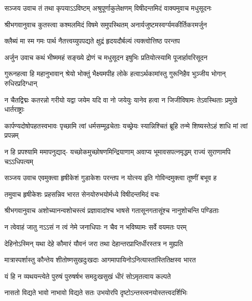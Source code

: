 {सञ्जय उवाच}
\twolineshloka
{तं तथा कृपयाऽऽविष्टम् अश्रुपूर्णाकुलेक्षणम्}
{विषीदन्तमिदं वाक्यमुवाच मधुसूदनः}%

{श्रीभगवानुवाच}\nopagebreak[4]
\twolineshloka
{कुतस्त्वा कश्मलमिदं विषमे समुपस्थितम्}
{अनार्यजुष्टमस्वर्ग्यमकीर्तिकरमर्जुन}%

\twolineshloka
{क्लैब्यं मा स्म गमः पार्थ नैतत्त्वय्युपपद्यते}
{क्षुद्रं हृदयदौर्बल्यं त्यक्त्वोत्तिष्ठ परन्तप}%

{अर्जुन उवाच}
\twolineshloka
{कथं भीष्ममहं सङ्ख्ये द्रोणं च मधुसूदन}
{इषुभिः प्रतियोत्स्यामि पूजार्हावरिसूदन}%

\fourlineindentedshloka
{गुरूनहत्वा हि महानुभावान्}
{श्रेयो भोक्तुं भैक्ष्यमपीह लोके}
{हत्वाऽर्थकामांस्तु गुरूनिहैव}
{भुञ्जीय भोगान् रुधिरप्रदिग्धान्}%

\fourlineindentedshloka
{न चैतद्विद्मः कतरन्नो गरीयो}
{यद्वा जयेम यदि वा नो जयेयुः}
{यानेव हत्वा न जिजीविषामः}
{तेऽवस्थिताः प्रमुखे धार्तराष्ट्राः}%

\fourlineindentedshloka
{कार्पण्यदोषोपहतस्वभावः}
{पृच्छामि त्वां धर्मसम्मूढचेताः}
{यच्छ्रेयः स्यान्निश्चितं ब्रूहि तन्मे}
{शिष्यस्तेऽहं शाधि मां त्वां प्रपन्नम्}%

\fourlineindentedshloka
{न हि प्रपश्यामि ममापनुद्याद्-}
{यच्छोकमुच्छोषणमिन्द्रियाणाम्}
{अवाप्य भूमावसपत्नमृद्धम्}
{राज्यं सुराणामपि चऽऽधिपत्यम्}%

{सञ्जय उवाच}
\twolineshloka
{एवमुक्त्वा हृषीकेशं गुडाकेशः परन्तप}
{न योत्स्य इति गोविन्दमुक्त्वा तूष्णीं बभूव ह}%

\twolineshloka
{तमुवाच हृषीकेशः प्रहसन्निव भारत}
{सेनयोरुभयोर्मध्ये विषीदन्तमिदं वचः}%

{श्रीभगवानुवाच}
\twolineshloka
{अशोच्यानन्वशोचस्त्वं प्रज्ञावादांश्च भाषसे}
{गतासूनगतासूंश्च नानुशोचन्ति पण्डिताः}%

\twolineshloka
{न त्वेवाहं जातु नऽऽसं न त्वं नेमे जनाधिपाः}
{न चैव न भविष्यामः सर्वे वयमतः परम्}%

\twolineshloka
{देहिनोऽस्मिन् यथा देहे कौमारं यौवनं जरा}
{तथा देहान्तरप्राप्तिर्धीरस्तत्र न मुह्यति}%

\twolineshloka
{मात्रास्पर्शास्तु कौन्तेय शीतोष्णसुखदुःखदाः}
{आगमापायिनोऽनित्यास्तांस्तितिक्षस्व भारत}%

\twolineshloka
{यं हि न व्यथयन्त्येते पुरुषं पुरुषर्षभ}
{समदुःखसुखं धीरं सोऽमृतत्वाय कल्पते}%

\twolineshloka
{नासतो विद्यते भावो नाभावो विद्यते सतः}
{उभयोरपि दृष्टोऽन्तस्त्वनयोस्तत्त्वदर्शिभिः}%

